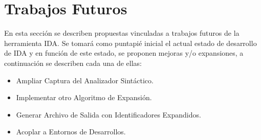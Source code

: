 
\pagebreak
\section{Trabajos Futuros}

En esta sección se describen propuestas vinculadas a trabajos futuros de la herramienta IDA. Se tomará como puntapié inicial el actual estado de desarrollo de IDA y en función de este estado, se proponen mejoras y/o expansiones, a continuación se describen cada una de ellas:

\begin{itemize}

\item Ampliar Captura del Analizador Sintáctico.

\item Implementar otro Algoritmo de Expansión.

\item Generar Archivo de Salida con Identificadores Expandidos.

\item Acoplar a Entornos de Desarrollos.

\end{itemize}

